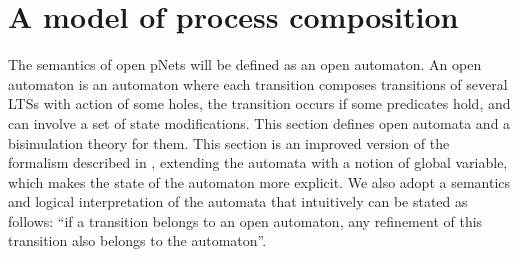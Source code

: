 \documentclass{elsarticle}
\begin{document}
\section{A model of process composition}\label{sec:OT}

The semantics of open pNets will be defined  as an open automaton. An open
automaton is an automaton where each transition composes transitions of several LTSs with
action of some holes, the transition occurs if some predicates hold, and can involve a 
set of state modifications. This section defines open automata and a bisimulation theory for them. This section is an improved version of the formalism described in \cite{henrio:Forte2016}, extending the automata with a notion of global variable, which makes the state of the automaton more explicit. We also adopt a semantics and logical interpretation of the automata that intuitively can be stated as follows: ``if a transition belongs to an open automaton, any refinement of this transition also belongs to the automaton''.
\end{document}
